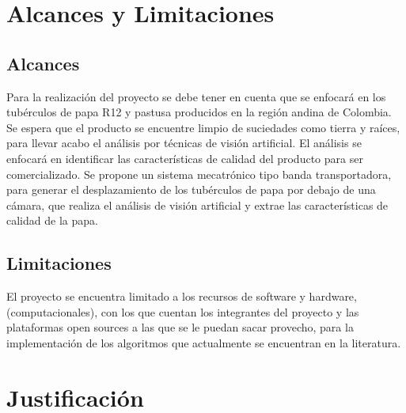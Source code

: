 \section{Alcances y Limitaciones}

\subsection{Alcances}

Para la realización del proyecto se debe tener en cuenta que se enfocará en los tubérculos de papa R12 y pastusa producidos en la región andina de Colombia. Se espera que el producto se encuentre limpio de suciedades como tierra y raíces, para llevar acabo el análisis por técnicas de visión artificial. El análisis se enfocará en identificar las características de calidad del producto para ser comercializado. Se propone un sistema mecatrónico tipo banda transportadora, para generar el desplazamiento de los tubérculos de papa por debajo de una cámara, que realiza el análisis de visión artificial y extrae las características de calidad de la papa.  

\subsection{Limitaciones}


El proyecto se encuentra limitado a los recursos de software y hardware, (computacionales), con los que cuentan los integrantes del proyecto y las plataformas open sources a las que se le puedan sacar provecho, para la implementación de los algoritmos que actualmente se encuentran en la literatura.

\section{Justificación}

